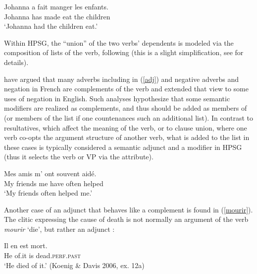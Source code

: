 \documentclass[output=paper
                ,modfonts
                ,nonflat
	        ,collection
	        ,collectionchapter
	        ,collectiontoclongg
 	        ,biblatex
                ,babelshorthands
                ,newtxmath
                ,draftmode
                ,colorlinks, citecolor=brown
]{./langsci/langscibook}
\begin{document}
\begin{exe}
\ex \label{faire}
\gll Johanna a fait manger les enfants. \\
Johanna has made eat the children \\
\glt `Johanna had the children eat.'
\end{exe}

\noindent
Within HPSG, the ``union'' of the two verbs' dependents is modeled via the composition of \argst lists of the  verb, following \citet{HinrichsandNakazawa1994} (this is a slight simplification, see   for details). 




\citet{AbeilleandGodard1997} have argued that many adverbs  including  in (\ref{adj}) and negative adverbs and negation in French are complements of the verb and \citet{KimandSag2002} extended that view to some uses of negation in English. Such analyses hypothesize that some semantic modifiers are realized as complements, and thus should be added as members of \argst (or members of the \deps list if one countenances such an additional list). In contrast to resultatives,  which affect the meaning of the verb, or to clause union, where one verb co-opts the argument structure of another verb, what is added to the \argst list in these cases is typically considered a semantic adjunct and a modifier in HPSG (thus it selects the verb or VP via the  attribute). 

\begin{exe}
\ex\label{adj}
 \gll
	Mes amis m’ ont souvent aidé. \\
	My friends me have often helped \\
	\glt `My friends often helped me.'
\end{exe}


Another case of an adjunct that behaves like a complement is found in (\ref{mourir}).  The clitic  expressing the cause of death   is not normally an argument of the verb \textit{mourir} `die', but rather an adjunct \citep{KoenigandDavis2006}: %

\begin{exe}
	\ex\label{mourir}
	\gll Il en est mort. \\
	 He of.it is dead.\textsc{perf.past} \\
	 \glt `He died of it.' (Koenig \& Davis 2006, ex. 12a)
\end{exe}
\end{document}
